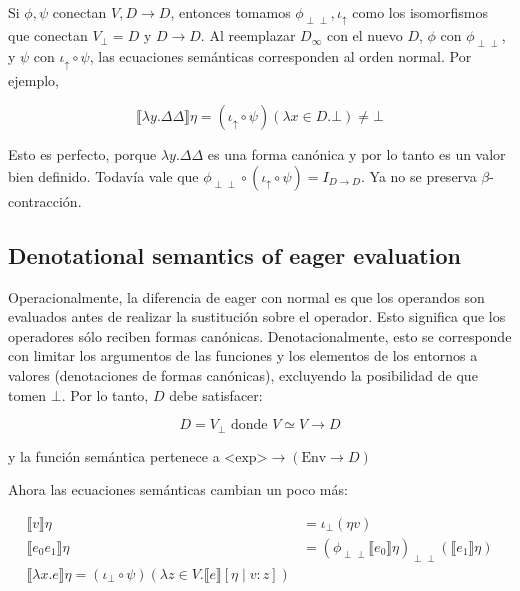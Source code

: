 \documentclass[article, 12pt]{article}
\newcommand{\ind}{\perp\!\!\!\perp}
\begin{document}
Si $\phi, \psi$ conectan $V, D \to D$, entonces tomamos $\phi_{\ind},
\iota_{\uparrow}$ como los isomorfismos que conectan $V_\bot = D$ y $D\to D$.
Al reemplazar $D_\infty$  con el nuevo $D$, $\phi$ con $\phi_{\ind}$, y $\psi$
con $\iota_{\uparrow} \circ \psi$, las ecuaciones semánticas corresponden al
orden normal. Por ejemplo, 

\begin{equation*}
  \llbracket \lambda y. \Delta \Delta \rrbracket\eta = (\iota_{\uparrow} \circ
  \psi)(\lambda x \in D.\bot ) \neq \bot 
\end{equation*}

Esto es perfecto, porque $\lambda y. \Delta \Delta$ es una forma canónica y por
lo tanto es un valor bien definido. Todavía vale que $\phi_{\ind}
\circ(\iota_{\uparrow} \circ \psi) = I_{D \to D}$. Ya no se preserva
$\beta$-contracción.

\subsection{Denotational semantics of eager evaluation}

Operacionalmente, la diferencia de eager con normal es que los operandos son
evaluados antes de realizar la sustitución sobre el operador. Esto significa que
los operadores sólo reciben formas canónicas. Denotacionalmente, esto se
corresponde con limitar los argumentos de las funciones y los elementos de los
entornos a valores (denotaciones de formas canónicas), excluyendo la posibilidad
de que tomen $\bot $. Por lo tanto, $D$ debe satisfacer:

\begin{equation*}
  D = V_\bot \text{ donde } V \simeq V \to D
\end{equation*}

y la función semántica pertenece a $\text{<exp>} \to (\text{Env} \to D)$ 

Ahora las ecuaciones semánticas cambian un poco más:

\begin{align*}
  \llbracket v \rrbracket\eta &= \iota_\bot(\eta v)\\ 
  \llbracket e_0 e_1 \rrbracket\eta &= (\phi_{\ind} \llbracket e_0 \rrbracket
  \eta)_{\ind} (\llbracket e_1 \rrbracket\eta) \\ 
  \llbracket \lambda x.e \rrbracket\eta = (\iota_\bot \circ \psi)(\lambda z \in
  V. \llbracket e \rrbracket[\eta \mid v : z])
\end{align*}
\end{document}
